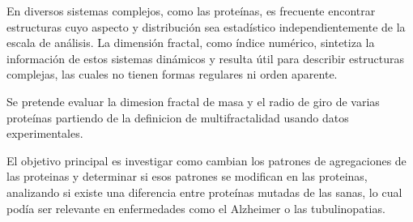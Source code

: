 \documentclass[11pt,a4paper]{letter}
\begin{document}
\onehalfspacing %



En diversos sistemas complejos, como las proteínas, es frecuente encontrar estructuras cuyo aspecto y distribución  sea estadístico independientemente de la escala de análisis. La dimensión fractal, como índice numérico, sintetiza la información de estos sistemas dinámicos y resulta útil para describir estructuras complejas, las cuales no tienen formas regulares ni orden aparente.


Se pretende evaluar la dimesion fractal de masa y el radio de giro de varias proteínas partiendo de la definicion de multifractalidad usando datos experimentales.

El objetivo principal es investigar como cambian los patrones de agregaciones de las proteinas y determinar si esos patrones se modifican en las proteinas, analizando si existe una diferencia entre proteínas mutadas de las sanas, lo cual podía ser relevante en enfermedades como el Alzheimer o las tubulinopatias.
\end{document}
